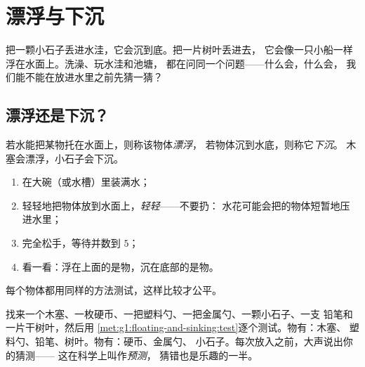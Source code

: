 \chapter{漂浮与下沉}\label{ch:g1:floating-and-sinking}

把一颗小石子丢进水洼，它会沉到底。把一片树叶丢进去，
它会像一只小船一样浮在水面上。洗澡、玩水洼和池塘，
都在问同一个问题——什么会，什么会，
我们能不能在放进水里之前先猜一猜？

\section{漂浮还是下沉？}

\begin{definition}[漂浮与下沉]\label{def:g1:floating-and-sinking:words}
若水能把某物托在水面上，则称该物体\emph{漂浮}，
若物体沉到水底，则称它\emph{下沉}。
木塞会漂浮，小石子会下沉。
\end{definition}

\begin{method}[公平的漂浮测试]\label{met:g1:floating-and-sinking:test}
\begin{enumerate}
  \item 在大碗（或水槽）里装满水；
  \item 轻轻地把物体放到水面上，\emph{轻轻}——不要扔：
        水花可能会把的物体短暂地压进水里；
  \item 完全松手，等待并数到 $5$；
  \item 看一看：浮在上面的是物，沉在底部的是物。
\end{enumerate}
每个物体都用同样的方法测试，这样比较才公平。
\end{method}

\begin{example}\label{ex:g1:floating-and-sinking:sorting}
找来一个木塞、一枚硬币、一把塑料勺、一把金属勺、一颗小石子、一支
铅笔和一片干树叶，然后用
\cref{met:g1:floating-and-sinking:test}逐个测试。物有：木塞、
塑料勺、铅笔、树叶。物有：硬币、金属勺、
小石子。每次放入之前，大声说出你的猜测——
这在科学上叫作\emph{预测}，
猜错也是乐趣的一半。
\end{example}

